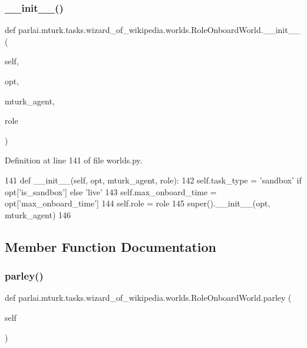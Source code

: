 \subsubsection{\texorpdfstring{\+\_\+\+\_\+init\+\_\+\+\_\+()}{\_\_init\_\_()}}
{\footnotesize\ttfamily def parlai.\+mturk.\+tasks.\+wizard\+\_\+of\+\_\+wikipedia.\+worlds.\+Role\+Onboard\+World.\+\_\+\+\_\+init\+\_\+\+\_\+ (\begin{DoxyParamCaption}\item[{}]{self,  }\item[{}]{opt,  }\item[{}]{mturk\+\_\+agent,  }\item[{}]{role }\end{DoxyParamCaption})}



Definition at line 141 of file worlds.\+py.


\begin{DoxyCode}
141     \textcolor{keyword}{def }\_\_init\_\_(self, opt, mturk\_agent, role):
142         self.task\_type = \textcolor{stringliteral}{'sandbox'} \textcolor{keywordflow}{if} opt[\textcolor{stringliteral}{'is\_sandbox'}] \textcolor{keywordflow}{else} \textcolor{stringliteral}{'live'}
143         self.max\_onboard\_time = opt[\textcolor{stringliteral}{'max\_onboard\_time'}]
144         self.role = role
145         super().\_\_init\_\_(opt, mturk\_agent)
146 
\end{DoxyCode}


\subsection{Member Function Documentation}
\mbox{\label{classparlai_1_1mturk_1_1tasks_1_1wizard__of__wikipedia_1_1worlds_1_1RoleOnboardWorld_aac8e70fe26f92df841e774fc1cb0bdb0}} 
\subsubsection{\texorpdfstring{parley()}{parley()}}
{\footnotesize\ttfamily def parlai.\+mturk.\+tasks.\+wizard\+\_\+of\+\_\+wikipedia.\+worlds.\+Role\+Onboard\+World.\+parley (\begin{DoxyParamCaption}\item[{}]{self }\end{DoxyParamCaption})}



